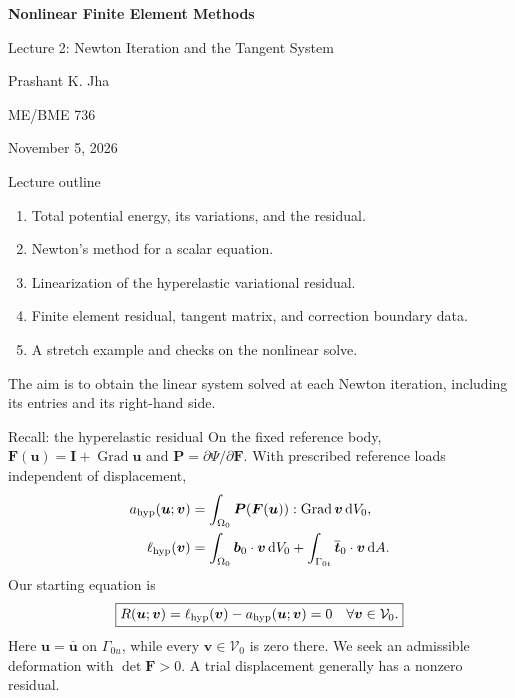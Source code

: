 \documentclass[11pt,aspectratio=169]{beamer}
\newcommand{\bu}{\bm u}
\newcommand{\bv}{\bm v}
\newcommand{\bF}{\bm F}
\newcommand{\bP}{\bm P}
\newcommand{\bI}{\bm I}
\newcommand{\bb}{\bm b}
\newcommand{\bt}{\bm t}
\newcommand{\Grad}{\operatorname{Grad}}
\newcommand{\Vzero}{\mathcal V_0}
\begin{document}
\begin{frame}
\centering\vfill
{\LARGE\bfseries Nonlinear Finite Element Methods\par}
\vspace{0.5cm}
{\Large Lecture 2: Newton Iteration and the Tangent System\par}
\vspace{0.5cm}
Prashant K. Jha\par
ME/BME 736\par
November 5, 2026
\vfill
\end{frame}

\begin{frame}{Lecture outline}
\begin{enumerate}
\item Total potential energy, its variations, and the residual.
\item Newton's method for a scalar equation.
\item Linearization of the hyperelastic variational residual.
\item Finite element residual, tangent matrix, and correction boundary data.
\item A stretch example and checks on the nonlinear solve.
\end{enumerate}
\vspace{0.3cm}
The aim is to obtain the linear system solved at each Newton iteration,
including its entries and its right-hand side.
\end{frame}

\begin{frame}{Recall: the hyperelastic residual}
On the fixed reference body, $\bF(\bu)=\bI+\Grad\bu$ and
$\bP=\partial\Psi/\partial\bF$.
With prescribed reference loads independent of displacement,
\[
\begin{aligned}
a_{\rm hyp}(\bu;\bv)
&=\int_{\Omega_0}\bP(\bF(\bu)):\Grad\bv\,\mathrm dV_0,\\
\ell_{\rm hyp}(\bv)
&=\int_{\Omega_0}\bb_0\cdot\bv\,\mathrm dV_0
+\int_{\Gamma_{0t}}\overline{\bt}_0\cdot\bv\,\mathrm dA.
\end{aligned}
\]
Our starting equation is
\[
\boxed{R(\bu;\bv)=\ell_{\rm hyp}(\bv)-a_{\rm hyp}(\bu;\bv)=0
\quad\forall\bv\in\Vzero.}
\]
Here $\bu=\overline{\bu}$ on $\Gamma_{0u}$, while every
$\bv\in\Vzero$ is zero there. We seek an admissible deformation with
$\det\bF>0$. A trial displacement generally has a nonzero residual.
\end{frame}
\end{document}
